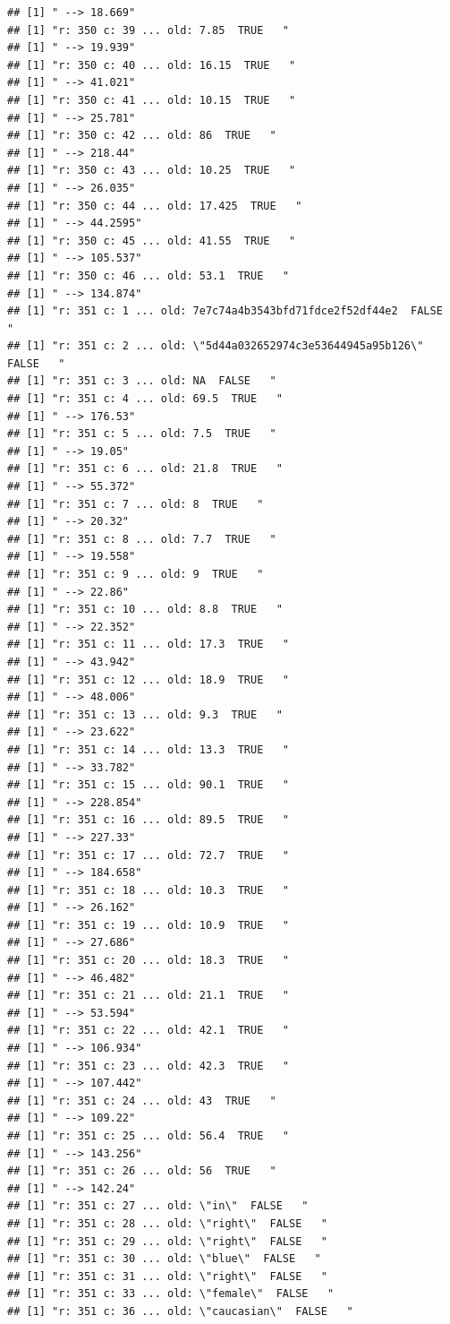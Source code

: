 \documentclass[]{article}
\begin{document}
\begin{verbatim}
## [1] " --> 18.669"
## [1] "r: 350 c: 39 ... old: 7.85  TRUE   "
## [1] " --> 19.939"
## [1] "r: 350 c: 40 ... old: 16.15  TRUE   "
## [1] " --> 41.021"
## [1] "r: 350 c: 41 ... old: 10.15  TRUE   "
## [1] " --> 25.781"
## [1] "r: 350 c: 42 ... old: 86  TRUE   "
## [1] " --> 218.44"
## [1] "r: 350 c: 43 ... old: 10.25  TRUE   "
## [1] " --> 26.035"
## [1] "r: 350 c: 44 ... old: 17.425  TRUE   "
## [1] " --> 44.2595"
## [1] "r: 350 c: 45 ... old: 41.55  TRUE   "
## [1] " --> 105.537"
## [1] "r: 350 c: 46 ... old: 53.1  TRUE   "
## [1] " --> 134.874"
## [1] "r: 351 c: 1 ... old: 7e7c74a4b3543bfd71fdce2f52df44e2  FALSE   "
## [1] "r: 351 c: 2 ... old: \"5d44a032652974c3e53644945a95b126\"  FALSE   "
## [1] "r: 351 c: 3 ... old: NA  FALSE   "
## [1] "r: 351 c: 4 ... old: 69.5  TRUE   "
## [1] " --> 176.53"
## [1] "r: 351 c: 5 ... old: 7.5  TRUE   "
## [1] " --> 19.05"
## [1] "r: 351 c: 6 ... old: 21.8  TRUE   "
## [1] " --> 55.372"
## [1] "r: 351 c: 7 ... old: 8  TRUE   "
## [1] " --> 20.32"
## [1] "r: 351 c: 8 ... old: 7.7  TRUE   "
## [1] " --> 19.558"
## [1] "r: 351 c: 9 ... old: 9  TRUE   "
## [1] " --> 22.86"
## [1] "r: 351 c: 10 ... old: 8.8  TRUE   "
## [1] " --> 22.352"
## [1] "r: 351 c: 11 ... old: 17.3  TRUE   "
## [1] " --> 43.942"
## [1] "r: 351 c: 12 ... old: 18.9  TRUE   "
## [1] " --> 48.006"
## [1] "r: 351 c: 13 ... old: 9.3  TRUE   "
## [1] " --> 23.622"
## [1] "r: 351 c: 14 ... old: 13.3  TRUE   "
## [1] " --> 33.782"
## [1] "r: 351 c: 15 ... old: 90.1  TRUE   "
## [1] " --> 228.854"
## [1] "r: 351 c: 16 ... old: 89.5  TRUE   "
## [1] " --> 227.33"
## [1] "r: 351 c: 17 ... old: 72.7  TRUE   "
## [1] " --> 184.658"
## [1] "r: 351 c: 18 ... old: 10.3  TRUE   "
## [1] " --> 26.162"
## [1] "r: 351 c: 19 ... old: 10.9  TRUE   "
## [1] " --> 27.686"
## [1] "r: 351 c: 20 ... old: 18.3  TRUE   "
## [1] " --> 46.482"
## [1] "r: 351 c: 21 ... old: 21.1  TRUE   "
## [1] " --> 53.594"
## [1] "r: 351 c: 22 ... old: 42.1  TRUE   "
## [1] " --> 106.934"
## [1] "r: 351 c: 23 ... old: 42.3  TRUE   "
## [1] " --> 107.442"
## [1] "r: 351 c: 24 ... old: 43  TRUE   "
## [1] " --> 109.22"
## [1] "r: 351 c: 25 ... old: 56.4  TRUE   "
## [1] " --> 143.256"
## [1] "r: 351 c: 26 ... old: 56  TRUE   "
## [1] " --> 142.24"
## [1] "r: 351 c: 27 ... old: \"in\"  FALSE   "
## [1] "r: 351 c: 28 ... old: \"right\"  FALSE   "
## [1] "r: 351 c: 29 ... old: \"right\"  FALSE   "
## [1] "r: 351 c: 30 ... old: \"blue\"  FALSE   "
## [1] "r: 351 c: 31 ... old: \"right\"  FALSE   "
## [1] "r: 351 c: 33 ... old: \"female\"  FALSE   "
## [1] "r: 351 c: 36 ... old: \"caucasian\"  FALSE   "

\end{verbatim}
\end{document}
